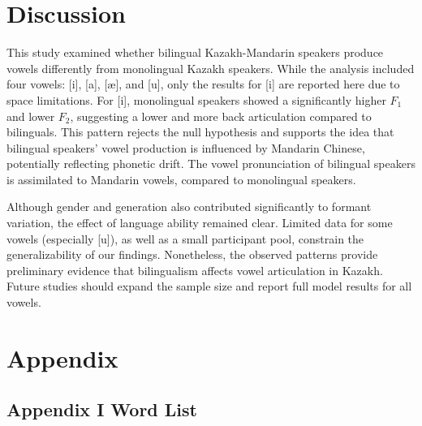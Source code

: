 \documentclass[
  man,floatsintext]{apa6}
\begin{document}
\section{Discussion}\label{discussion}

This study examined whether bilingual Kazakh-Mandarin speakers produce vowels differently from monolingual Kazakh speakers. While the analysis included four vowels: {[}i{]}, {[}a{]}, {[}æ{]}, and {[}u{]}, only the results for {[}i{]} are reported here due to space limitations. For {[}i{]}, monolingual speakers showed a significantly higher \(F_1\) and lower \(F_2\), suggesting a lower and more back articulation compared to bilinguals. This pattern rejects the null hypothesis and supports the idea that bilingual speakers' vowel production is influenced by Mandarin Chinese, potentially reflecting phonetic drift. The vowel pronunciation of bilingual speakers is assimilated to Mandarin vowels, compared to monolingual speakers.

Although gender and generation also contributed significantly to formant variation, the effect of language ability remained clear. Limited data for some vowels (especially {[}u{]}), as well as a small participant pool, constrain the generalizability of our findings. Nonetheless, the observed patterns provide preliminary evidence that bilingualism affects vowel articulation in Kazakh. Future studies should expand the sample size and report full model results for all vowels.

\newpage

\section{Appendix}\label{appendix}

\subsection{Appendix I Word List}\label{appendix-i-word-list}
\end{document}
